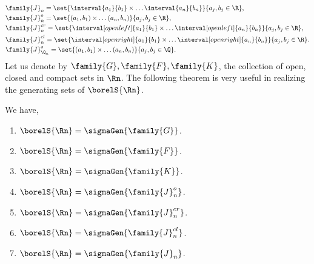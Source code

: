 \begin{align*}
    &\family{J}_{n} = \set{\interval{a_1}{b_1} \times \dots \interval{a_n}{b_n}}{a_j,b_j \in \R}, \\	
    &\family{J}^{o}_{n} = \set{(a_1,b_1) \times \dots (a_n,b_n)}{a_j,b_j \in \R}, \\	
    &\family{J}^{cr}_{n} = \set{\interval[open left]{a_1}{b_1} \times \dots 
	\interval[open left]{a_n}{b_n}}{a_j,b_j \in \R}, \\	
    &\family{J}^{cl}_{n} = \set{\interval[open right]{a_1}{b_1} \times \dots 
	\interval[open right]{a_n}{b_n}}{a_j,b_j \in \R}. \\	
    &\family{J}^{o}_{\Q_{n}} = \set{(a_1,b_1) \times \dots 
	(a_n,b_n)}{a_j,b_j \in \Q}. \\	
\end{align*}
Let us denote by $\family{G},\family{F},\family{K}$, the collection of open, closed and compact sets
in $\Rn$. The following theorem is very useful in realizing the generating sets of $\borelS{\Rn}$.
\begin{Theorem}[name=Generating Borel Sets in $\Rn$]\label{thm:gen_borel_rn}
    We have,
    \begin{enumerate}
	\item 
	    $\borelS{\Rn} = \sigmaGen{\family{G}}$.
	\item
	    $\borelS{\Rn} = \sigmaGen{\family{F}}$.
	\item
	    $\borelS{\Rn} = \sigmaGen{\family{K}}$.
	\item
	    $\borelS{\Rn} = \sigmaGen{\family{J}^{o}_{n}}$.
	\item
	    $\borelS{\Rn} = \sigmaGen{\family{J}^{cr}_{n}}$.
	\item
	    $\borelS{\Rn} = \sigmaGen{\family{J}^{cl}_{n}}$.
	\item
	    $\borelS{\Rn} = \sigmaGen{\family{J}_{n}}$.
    \end{enumerate}
\end{Theorem}

